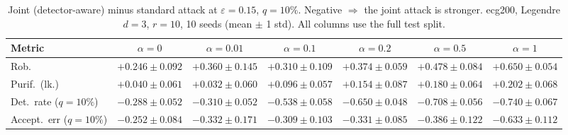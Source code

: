 \begin{table}[htbp]
  \centering
  \small
  \begin{tabular}{@{}lcccccc@{}}
    \toprule
    Metric & $\alpha{=}0$ & $\alpha{=}0.01$ & $\alpha{=}0.1$ & $\alpha{=}0.2$ & $\alpha{=}0.5$ & $\alpha{=}1$ \\
    \midrule
    Rob. & $+0.246 \pm 0.092$ & $+0.360 \pm 0.145$ & $+0.310 \pm 0.109$ & $+0.374 \pm 0.059$ & $+0.478 \pm 0.084$ & $+0.650 \pm 0.054$ \\
    Purif.\ (lk.) & $+0.040 \pm 0.061$ & $+0.032 \pm 0.060$ & $+0.096 \pm 0.057$ & $+0.154 \pm 0.087$ & $+0.180 \pm 0.064$ & $+0.202 \pm 0.068$ \\
    Det.\ rate ($q{=}10\%$) & $-0.288 \pm 0.052$ & $-0.310 \pm 0.052$ & $-0.538 \pm 0.058$ & $-0.650 \pm 0.048$ & $-0.708 \pm 0.056$ & $-0.740 \pm 0.067$ \\
    Accept.\ err ($q{=}10\%$) & $-0.252 \pm 0.084$ & $-0.332 \pm 0.171$ & $-0.309 \pm 0.103$ & $-0.331 \pm 0.085$ & $-0.386 \pm 0.122$ & $-0.633 \pm 0.112$ \\
    \bottomrule
  \end{tabular}
  \caption{Joint (detector-aware) minus standard attack at $\varepsilon=0.15$, $q{=}10\%$. Negative $\Rightarrow$ the joint attack is stronger. ecg200, Legendre $d{=}3$, $r{=}10$, 10 seeds (mean $\pm$ 1 std). All columns use the full test split.}
  \label{tab:ecg200_joint_r10_eps0.15}
\end{table}
